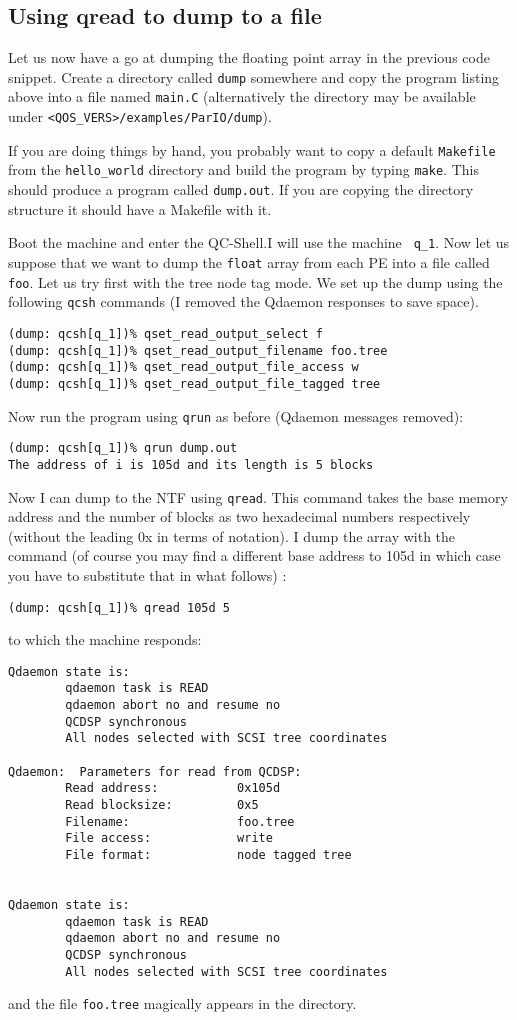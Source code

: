 \subsection{Using qread to dump to a file}
Let us now have a go at dumping the floating point array in the previous
code snippet. Create a directory called {\tt dump} somewhere and copy
the program listing above into a file named {\tt main.C} (alternatively
the directory may be available under {\tt <QOS\_VERS>/examples/ParIO/dump}).

If you are doing things by hand, you probably want to copy a 
default {\tt Makefile} from the {\tt hello\_world} directory and
build the program by typing {\tt make}. This should produce a program
called {\tt dump.out}. If you are copying the directory structure it should
have a Makefile with it.

Boot the machine and enter the QC-Shell.I will use the machine {\tt
q\_1}.  Now let us suppose that we want to dump the {\tt float} array
from each PE into a file called {\tt foo}.  Let us try first with the
tree node tag mode. We set up the dump using the following {\tt qcsh}
commands (I removed the Qdaemon responses to save space).
\begin{verbatim}
(dump: qcsh[q_1])% qset_read_output_select f
(dump: qcsh[q_1])% qset_read_output_filename foo.tree
(dump: qcsh[q_1])% qset_read_output_file_access w
(dump: qcsh[q_1])% qset_read_output_file_tagged tree
\end{verbatim}

Now run the program using {\tt qrun} as before (Qdaemon messages removed):
\begin{verbatim}
(dump: qcsh[q_1])% qrun dump.out
The address of i is 105d and its length is 5 blocks
\end{verbatim}
Now I can dump to the NTF using {\tt qread}. This command takes the 
base memory address and the number of blocks as two hexadecimal numbers
respectively (without the leading 0x in terms of notation). I dump the 
array with the command (of course you may find a different base 
address to 105d in which case you have to substitute that in what
follows) :
\begin{verbatim}
(dump: qcsh[q_1])% qread 105d 5
\end{verbatim}
to which the machine responds:
\begin{verbatim}
Qdaemon state is:
        qdaemon task is READ
        qdaemon abort no and resume no
        QCDSP synchronous
        All nodes selected with SCSI tree coordinates

Qdaemon:  Parameters for read from QCDSP:
        Read address:           0x105d
        Read blocksize:         0x5
        Filename:               foo.tree
        File access:            write
        File format:            node tagged tree


Qdaemon state is:
        qdaemon task is READ
        qdaemon abort no and resume no
        QCDSP synchronous
        All nodes selected with SCSI tree coordinates
\end{verbatim}
and the file {\tt foo.tree} magically appears in the directory.

